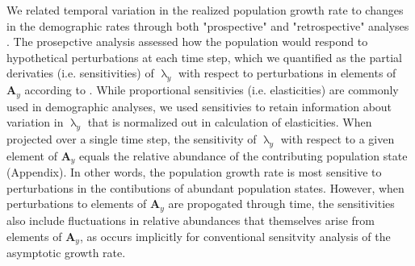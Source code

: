 {We related temporal variation in the realized population growth rate 
to changes in the demographic rates 
through both "prospective" and "retrospective" analyses \citep{caswell2001matrix}.
The prosepctive analysis assessed how the population 
would respond to hypothetical perturbations at each time step,
which we quantified as
the partial derivaties (i.e. sensitivities) of $\uplambda_y$ 
with respect to perturbations in elements of $\mathbf{A}_y$ 
according to \cite{caswell2007sensitivity}. 
While proportional sensitivies (i.e. elasticities) 
are commonly used in demographic analyses,
we used sensitivies to retain information about variation in $\uplambda_y$
that is normalized out in calculation of elasticities. 
When projected over a single time step, 
the sensitivity of $\uplambda_y$ with respect to a given element of $\mathbf{A}_y$
equals the relative abundance 
of the contributing population state (Appendix).
In other words, the population growth rate is most sensitive to perturbations
in the contibutions of abundant population states.
However, when perturbations to elements of $\mathbf{A}_y$ are propogated through time,
the sensitivities also include fluctuations
in relative abundances that themselves arise from elements of $\mathbf{A}_y$,
as occurs implicitly for conventional sensitvity analysis of the asymptotic growth rate.

}
